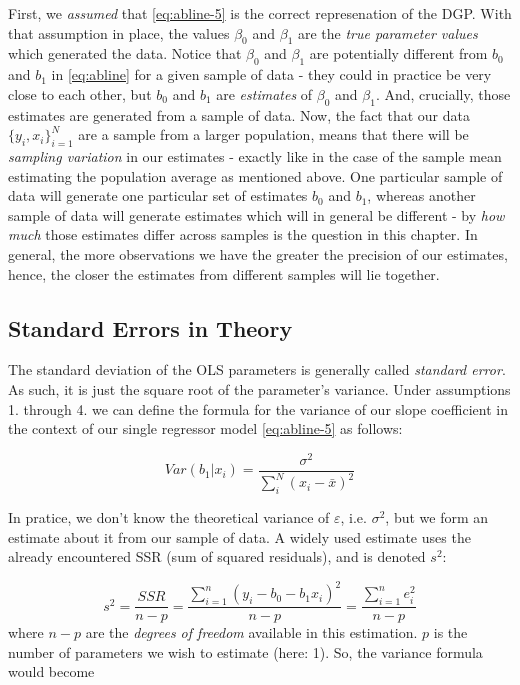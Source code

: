 \documentclass[]{book}
\begin{document}
First, we \emph{assumed} that \eqref{eq:abline-5} is the correct
represenation of the DGP. With that assumption in place, the values
\(\beta_0\) and \(\beta_1\) are the \emph{true parameter values} which
generated the data. Notice that \(\beta_0\) and \(\beta_1\) are
potentially different from \(b_0\) and \(b_1\) in \eqref{eq:abline} for a
given sample of data - they could in practice be very close to each
other, but \(b_0\) and \(b_1\) are \emph{estimates} of \(\beta_0\) and
\(\beta_1\). And, crucially, those estimates are generated from a sample
of data. Now, the fact that our data \(\{y_i,x_i\}_{i=1}^N\) are a
sample from a larger population, means that there will be \emph{sampling
variation} in our estimates - exactly like in the case of the sample
mean estimating the population average as mentioned above. One
particular sample of data will generate one particular set of estimates
\(b_0\) and \(b_1\), whereas another sample of data will generate
estimates which will in general be different - by \emph{how much} those
estimates differ across samples is the question in this chapter. In
general, the more observations we have the greater the precision of our
estimates, hence, the closer the estimates from different samples will
lie together.

\subsection{Standard Errors in Theory}\label{se-theory}

The standard deviation of the OLS parameters is generally called
\emph{standard error}. As such, it is just the square root of the
parameter's variance. Under assumptions 1. through 4. we can define the
formula for the variance of our slope coefficient in the context of our
single regressor model \eqref{eq:abline-5} as follows:

\begin{equation}
Var(b_1|x_i) = \frac{\sigma^2}{\sum_i^N (x_i - \bar{x})^2}  \label{eq:var-ols}
\end{equation}

In pratice, we don't know the theoretical variance of \(\varepsilon\),
i.e. \(\sigma^2\), but we form an estimate about it from our sample of
data. A widely used estimate uses the already encountered SSR (sum of
squared residuals), and is denoted \(s^2\):

\[
s^2 = \frac{SSR}{n-p} = \frac{\sum_{i=1}^n (y_i - b_0 - b_1 x_i)^2}{n-p} =  \frac{\sum_{i=1}^n e_i^2}{n-p}
\] where \(n-p\) are the \emph{degrees of freedom} available in this
estimation. \(p\) is the number of parameters we wish to estimate (here:
1). So, the variance formula would become
\end{document}
